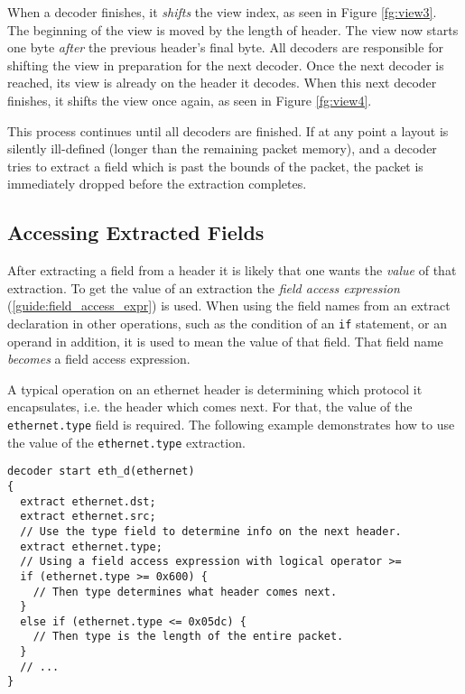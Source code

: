 
When a decoder finishes, it \textit{shifts} the view index, as seen in Figure
\ref{fg:view3}. The beginning of the view is moved by the length of header.
The view now starts one byte \textit{after} the previous header's final byte. 
All decoders are responsible for shifting the view in
preparation for the next decoder. Once the next decoder is reached, its view is
already on the header it decodes. When this next decoder finishes, it shifts the
view once again, as seen in Figure \ref{fg:view4}.

This process continues until all decoders are finished.
If at any point a layout is silently ill-defined 
(longer than the remaining packet memory), and a decoder tries
to extract a field which is past the bounds of the packet, the packet
is immediately dropped before the extraction completes.

\subsection{Accessing Extracted Fields} \label{tut:decoder_access}

After extracting a field from a header it is likely that one wants the
\textit{value} of that extraction. To get the value of an extraction
the \textit{field access expression} (\ref{guide:field_access_expr}) is used. When
using the field names from an extract declaration in other operations, such as
the condition of an \texttt{if} statement, or an operand in addition, it is used to
mean the value of that field. That field name \textit{becomes} a field access
expression.

A typical operation on an ethernet header is determining which protocol
it encapsulates, i.e. the header which comes next. For that, the value of the \texttt{ethernet.type} field is required.
The following example demonstrates how to use the value of the \texttt{ethernet.type} extraction.

\begin{codepage}
\begin{lstlisting}
decoder start eth_d(ethernet)
{
  extract ethernet.dst;
  extract ethernet.src;
  // Use the type field to determine info on the next header.
  extract ethernet.type;
  // Using a field access expression with logical operator >=
  if (ethernet.type >= 0x600) {
    // Then type determines what header comes next.
  }
  else if (ethernet.type <= 0x05dc) {
    // Then type is the length of the entire packet.
  }
  // ...
}
\end{lstlisting}
\end{codepage}

